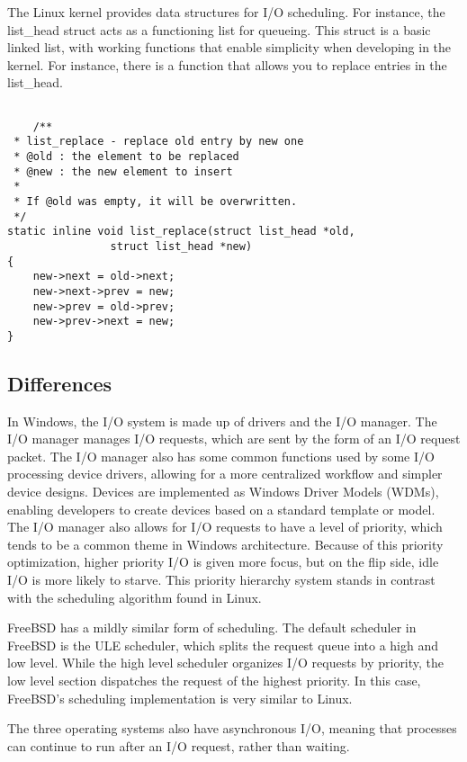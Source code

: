 \documentclass[journal, letterpaper, draftclsnofoot, onecolumn, 10pt]{IEEEtran}
\begin{document}
The Linux kernel provides data structures for I/O scheduling. For instance, the list\_head struct acts as a functioning list for queueing. This struct is a basic linked list, with working functions that enable simplicity when developing in the kernel. For instance, there is a function that allows you to replace entries in the list\_head. \cite{listh}
\begin{lstlisting}[frame=single, basicstyle=\small]

    /**
 * list_replace - replace old entry by new one
 * @old : the element to be replaced
 * @new : the new element to insert
 *
 * If @old was empty, it will be overwritten.
 */
static inline void list_replace(struct list_head *old,
				struct list_head *new)
{
	new->next = old->next;
	new->next->prev = new;
	new->prev = old->prev;
	new->prev->next = new;
}
\end{lstlisting}

\subsection{Differences}

In Windows, the I/O system is made up of drivers and the I/O manager. The I/O manager manages I/O requests, which are sent by the form of an I/O request packet. The I/O manager also has some common functions used by some I/O processing device drivers, allowing for a more centralized workflow and simpler device designs. Devices are implemented as Windows Driver Models (WDMs), enabling developers to create devices based on a standard template or model. The I/O manager also allows for I/O requests to have a level of priority, which tends to be a common theme in Windows architecture. Because of this priority optimization, higher priority I/O is given more focus, but on the flip side, idle I/O is more likely to starve. This priority hierarchy system stands in contrast with the scheduling algorithm found in Linux.

FreeBSD has a mildly similar form of scheduling. The default scheduler in FreeBSD is the ULE scheduler, which splits the request queue into a high and low level. While the high level scheduler organizes I/O requests by priority, the low level section dispatches the request of the highest priority. In this case, FreeBSD's scheduling implementation is very similar to Linux.

The three operating systems also have asynchronous I/O, meaning that processes can continue to run after an I/O request, rather than waiting.
\end{document}
